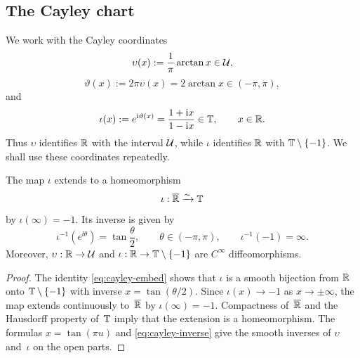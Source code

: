 \subsection{The Cayley chart}\label{sec:cayley-gate}

We work with the Cayley coordinates
\begin{equation}\label{eq:phase-coord}
\upsilon(x):=\frac{1}{\pi}\arctan x\in \mathcal{U},
\end{equation}
\begin{equation}\label{eq:angular-var}
\vartheta(x):=2\pi\upsilon(x)=2\arctan x\in(-\pi,\pi),
\end{equation}
and
\begin{equation}\label{eq:cayley-embed}
\iota(x):=e^{\mathrm{i}\vartheta(x)}=\frac{1+\mathrm{i} x}{1-\mathrm{i} x}\in\mathbb{T},
\qquad x\in\mathbb{R}.
\end{equation}
Thus $\upsilon$ identifies $\mathbb{R}$ with the interval $\mathcal{U}$, while $\iota$
identifies $\mathbb{R}$ with $\mathbb{T}\setminus\{-1\}$.  We shall use these
coordinates repeatedly.

\begin{proposition}\label{prop:cayley-homeo}
The map $\iota$ extends to a homeomorphism
\[
\iota:\overline{\mathbb{R}}\xrightarrow{\sim}\mathbb{T}
\]
by $\iota(\infty)=-1$.  Its inverse is given by
\begin{equation}\label{eq:cayley-inverse}
\iota^{-1}(e^{\ii\theta})=\tan\frac{\theta}{2},
\qquad
\theta\in(-\pi,\pi),
\qquad
\iota^{-1}(-1)=\infty.
\end{equation}
Moreover, $\upsilon:\mathbb{R}\to\mathcal{U}$ and
$\iota:\mathbb{R}\to\mathbb{T}\setminus\{-1\}$ are $C^\infty$ diffeomorphisms.
\end{proposition}

\begin{proof}
The identity \eqref{eq:cayley-embed} shows that $\iota$ is a smooth
bijection from $\mathbb{R}$ onto $\mathbb{T}\setminus\{-1\}$ with inverse
$x=\tan(\theta/2)$.  Since $\iota(x)\to -1$ as $x\to\pm\infty$, the map
extends continuously to~$\overline{\mathbb{R}}$ by $\iota(\infty)=-1$.
Compactness of~$\overline{\mathbb{R}}$ and the Hausdorff property of~$\mathbb{T}$
imply that the extension is a homeomorphism.  The formulas
$x=\tan(\pi u)$ and \eqref{eq:cayley-inverse} give the smooth inverses
of $\upsilon$ and~$\iota$ on the open parts.
\end{proof}
